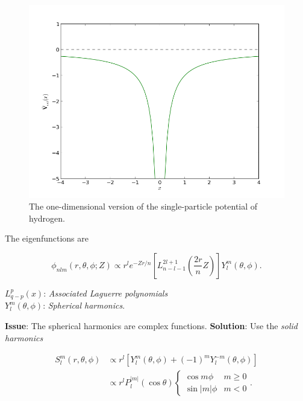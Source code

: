 \begin{frame}
\begin{figure}
 \begin{center}
  \includegraphics[scale=0.4]{../graphics/Potentials/hydrogen.png}
  \caption{The one-dimensional version of the single-particle potential of hydrogen.}
  \label{fig:extPotHydrogen}
 \end{center}
\end{figure}
\end{frame}

\begin{frame}
 The eigenfunctions are
 
 \begin{equation*}
 \phi_{nlm}(r, \theta, \phi; Z) \propto r^l e^{-Zr/n}\left[L_{n-l-1}^{2l+1}\left(\frac{2r}{n}Z\right)\right] Y_l^m(\theta, \phi).
\end{equation*}

$L_{q-p}^p(x)$: \textit{Associated Laguerre polynomials} \\
$Y_l^m(\theta, \phi)$: \textit{Spherical harmonics}. 
% 

\end{frame}

\begin{frame}
 \textbf{Issue}: The spherical harmonics are complex functions. 
 \shift
 \textbf{Solution}: Use the \textit{solid harmonics}
 
 \begin{align}
S_l^m(r, \theta, \phi) &\propto r^l\left[Y_l^m(\theta, \phi) + (-1)^m Y_l^{-m}(\theta, \phi)\right] \\
 &\propto r^{l} P_l^{|m|}(\cos\theta) \begin{cases} \cos m\phi & m \ge 0 \\ \sin|m|\phi &  m < 0 \end{cases}.     
\end{align}

 \end{frame}
 
